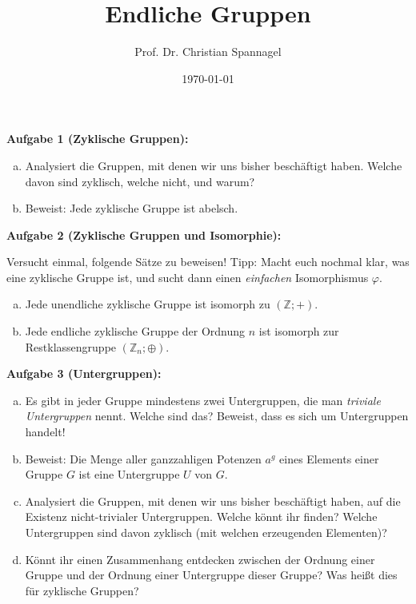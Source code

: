 \documentclass{cssheet}
\title{Endliche Gruppen}
\author{Prof. Dr. Christian Spannagel}
\date{\today}
\begin{document}
	\printtitle


\textbf{Aufgabe 1 (Zyklische Gruppen):} 

\begin{enumerate}[a)]
\item Analysiert die Gruppen, mit denen wir uns bisher beschäftigt haben. Welche davon sind zyklisch, welche nicht, und warum?
\item Beweist: Jede zyklische Gruppe ist abelsch.
\end{enumerate}

\textbf{Aufgabe 2 (Zyklische Gruppen und Isomorphie):} 

Versucht einmal, folgende Sätze zu beweisen! Tipp: Macht euch nochmal klar, was eine zyklische Gruppe ist, und sucht dann einen \emph{einfachen} Isomorphismus $\varphi$.
\begin{enumerate}[a)]
	\item Jede unendliche zyklische Gruppe ist isomorph zu $(\mathbb{Z};+)$.
	\item Jede endliche zyklische Gruppe der Ordnung $n$ ist isomorph zur Restklassengruppe $(\mathbb{Z}_n;\oplus)$.
\end{enumerate}

\textbf{Aufgabe 3 (Untergruppen):}  
\begin{enumerate}[a)]
\item Es gibt in jeder Gruppe mindestens zwei Untergruppen, die man \emph{triviale Untergruppen} nennt. Welche sind das? Beweist, dass es sich um Untergruppen handelt!
\item Beweist: Die Menge aller ganzzahligen Potenzen $a^g$ eines Elements einer Gruppe $G$ ist eine Untergruppe $U$ von $G$.
\item Analysiert die Gruppen, mit denen wir uns bisher beschäftigt haben, auf die Existenz nicht-trivialer Untergruppen. Welche könnt ihr finden? Welche Untergruppen sind davon zyklisch (mit welchen erzeugenden Elementen)?
\item Könnt ihr einen Zusammenhang entdecken zwischen der Ordnung einer Gruppe und der Ordnung einer Untergruppe dieser Gruppe? Was heißt dies für zyklische Gruppen?
\end{enumerate}


\vspace*{2cm}
\printlicense

\printsocials
\end{document}
